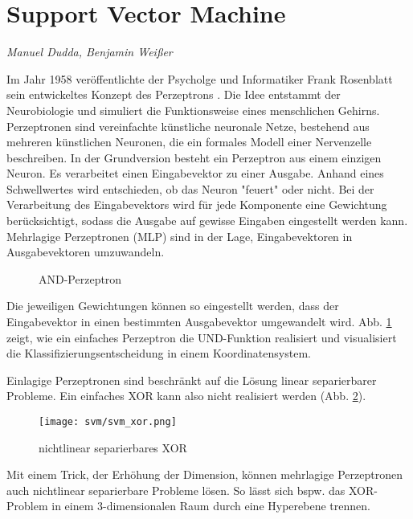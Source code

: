 \section{Support Vector Machine}
\label{mainsec:svm}
\textit{Manuel Dudda, Benjamin Weißer}

Im Jahr 1958 veröffentlichte der Psycholge und Informatiker Frank Rosenblatt sein entwickeltes Konzept des Perzeptrons \cite{rosenblatt58a}. 
Die Idee entstammt der Neurobiologie und simuliert die Funktionsweise eines menschlichen Gehirns. 
Perzeptronen sind vereinfachte künstliche neuronale Netze, bestehend aus mehreren künstlichen Neuronen, die ein formales Modell einer Nervenzelle beschreiben. 
In der Grundversion besteht ein Perzeptron aus einem einzigen Neuron. 
Es verarbeitet einen Eingabevektor zu einer Ausgabe. 
Anhand eines Schwellwertes wird entschieden, ob das Neuron "{}feuert"{} oder nicht. 
Bei der Verarbeitung des Eingabevektors wird für jede Komponente eine Gewichtung berücksichtigt, sodass die Ausgabe auf gewisse Eingaben eingestellt werden kann. 
Mehrlagige Perzeptronen (MLP) sind in der Lage, Eingabevektoren in Ausgabevektoren umzuwandeln. 

\begin{figure}[htbp] \centering
    \caption{AND-Perzeptron}
    \label{fig:perceptron_and}
\end{figure}

Die jeweiligen Gewichtungen können so eingestellt werden, dass der Eingabevektor in einen bestimmten Ausgabevektor umgewandelt wird. 
Abb. \ref{fig:perceptron_and} zeigt, wie ein einfaches Perzeptron die UND-Funktion realisiert und visualisiert die Klassifizierungsentscheidung in einem Koordinatensystem. 

Einlagige Perzeptronen sind beschränkt auf die Lösung linear separierbarer Probleme. 
Ein einfaches XOR kann also nicht realisiert werden (Abb. \ref{fig:perceptron_xor}). 

\begin{figure}[htbp] \centering
    \texttt{[image: svm/svm\_xor.png]}
    \caption{nichtlinear separierbares XOR}
    \label{fig:perceptron_xor}
\end{figure}


Mit einem Trick, der Erhöhung der Dimension, können mehrlagige Perzeptronen auch nichtlinear separierbare Probleme lösen. 
So lässt sich bspw. das XOR-Problem in einem 3-dimensionalen Raum durch eine Hyperebene trennen.

